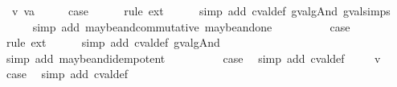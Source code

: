 \begin{isabellebody}
\ {\isacharparenleft}{\isachardoublequoteopen}{}{\isacharunderscore}{}{\isachardoublequoteclose}\ v\ va{\isacharparenright}\isanewline
\ \ \isamarkupfalse%
\ \isamarkupfalse%
\ {\isacharquery}case\isanewline
\ \ \ \ \isamarkupfalse%
\ {\isacharparenleft}rule\ ext{\isacharparenright}{\isacharplus}\isanewline
\ \ \ \ \isamarkupfalse%
\ {\isacharparenleft}simp\ add{\isacharcolon}\ cval{\isacharunderscore}def\ gval{\isacharunderscore}gAnd\ gval{\isachardot}simps{\isacharparenleft}{}{\isacharparenright}{\isacharparenright}\isanewline
\ \ \ \ \isamarkupfalse%
\ {\isacharparenleft}simp\ add{\isacharcolon}\ maybe{\isacharunderscore}and{\isacharunderscore}commutative\ maybe{\isacharunderscore}and{\isacharunderscore}one{\isacharparenright}\isanewline
{}\isamarkupfalse%
\isanewline
\ \ \isamarkupfalse%
\ {\isachardoublequoteopen}{}{\isacharunderscore}{}{\isachardoublequoteclose}\isanewline
\ \ \isamarkupfalse%
\ \isamarkupfalse%
\ {\isacharquery}case\isanewline
\ \ \ \ \isamarkupfalse%
\ {\isacharparenleft}rule\ ext{\isacharparenright}{\isacharplus}\isanewline
\ \ \ \ \isamarkupfalse%
\ {\isacharparenleft}simp\ add{\isacharcolon}\ cval{\isacharunderscore}def\ gval{\isacharunderscore}gAnd{\isacharparenright}\isanewline
\ \ \ \ \isamarkupfalse%
\ {\isacharparenleft}simp\ add{\isacharcolon}\ maybe{\isacharunderscore}and{\isacharunderscore}idempotent{\isacharparenright}\isanewline
{}\isamarkupfalse%
\isanewline
\ \ \isamarkupfalse%
\ {\isachardoublequoteopen}{}{\isacharunderscore}{}{\isachardoublequoteclose}\isanewline
\ \ \isamarkupfalse%
\ \isamarkupfalse%
\ {\isacharquery}case\ \isamarkupfalse%
\ {\isacharparenleft}simp\ add{\isacharcolon}\ cval{\isacharunderscore}def{\isacharparenright}\isanewline
{}\isamarkupfalse%
\isanewline
\ \ \isamarkupfalse%
\ {\isacharparenleft}{\isachardoublequoteopen}{}{\isacharunderscore}{}{\isachardoublequoteclose}\ v{\isacharparenright}\isanewline
\ \ \isamarkupfalse%
\ \isamarkupfalse%
\ {\isacharquery}case\ \isamarkupfalse%
\ {\isacharparenleft}simp\ add{\isacharcolon}\ cval{\isacharunderscore}def{\isacharparenright}\isanewline
{}\isamarkupfalse%
\isanewline

\end{isabellebody}
